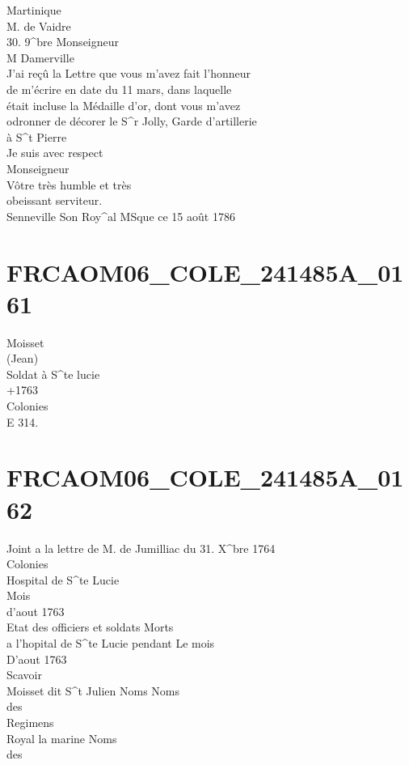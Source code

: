 \documentclass{article}
\begin{document}
\begin{pages}
Martinique\\
M. de Vaidre\\
30. 9\^{}bre
\normalsize \pstart
Monseigneur\\
M Damerville\\
J'ai reçû la Lettre que vous m'avez fait l'honneur\\
de m'écrire en date du 11 mars, dans laquelle\\
était incluse la Médaille d'or, dont vous m'avez\\
odronner de décorer le S\^{}r Jolly, Garde d'artillerie\\
à S\^{}t Pierre\\
Je suis avec respect\\
Monseigneur\\
Vôtre très humble et très\\
obeissant serviteur.\\
Senneville
\pend\pstart
Son Roy\^{}al MSque ce 15 août 1786
\pend
\endnumbering\beginnumbering\section{FRCAOM06\_COLE\_241485A\_0161}\pstart
Moisset\\
(Jean)\\
Soldat à S\^{}te lucie\\
+1763\\
Colonies\\
E 314.
\pend
\endnumbering\beginnumbering\section{FRCAOM06\_COLE\_241485A\_0162}\pstart
Joint a la lettre de M. de Jumilliac du 31. X\^{}bre 1764\\
Colonies\\
Hospital de S\^{}te Lucie\\
Mois\\
d'aout 1763\\
Etat des officiers et soldats Morts\\
a l'hopital de S\^{}te Lucie pendant Le mois\\
D'aout 1763\\
Scavoir\\
Moisset dit S\^{}t Julien
\pend\pstart
Noms Noms\\
des\\
Regimens\\
Royal la marine
\pend\pstart
Noms\\
des\\

\end{pages}
\end{document}
